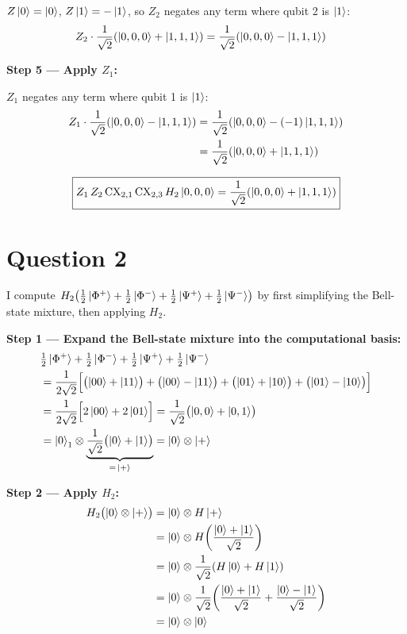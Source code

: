 \documentclass[12pt,a4paper]{article}
\begin{document}
$Z\ket{0}=\ket{0}$, $Z\ket{1}=-\ket{1}$, so $Z_2$ negates any term where qubit 2 is $\ket{1}$:
\begin{align*}
Z_2\cdot\frac{1}{\sqrt{2}}\!\left(\ket{0,0,0}+\ket{1,1,1}\right)
  &= \frac{1}{\sqrt{2}}\!\left(\ket{0,0,0}-\ket{1,1,1}\right)
\end{align*}

\textbf{Step 5 --- Apply $Z_1$:}

$Z_1$ negates any term where qubit 1 is $\ket{1}$:
\begin{align*}
Z_1\cdot\frac{1}{\sqrt{2}}\!\left(\ket{0,0,0}-\ket{1,1,1}\right)
  &= \frac{1}{\sqrt{2}}\!\left(\ket{0,0,0}-(-1)\ket{1,1,1}\right) \\
  &= \frac{1}{\sqrt{2}}\!\left(\ket{0,0,0}+\ket{1,1,1}\right)
\end{align*}

\[
  \boxed{Z_1\,Z_2\,\mathrm{CX}_{2,1}\,\mathrm{CX}_{2,3}\,H_2\ket{0,0,0}
         = \frac{1}{\sqrt{2}}\!\left(\ket{0,0,0}+\ket{1,1,1}\right)}
\]

\section*{Question 2}

I compute $H_2\!\left(\tfrac{1}{2}\ket{\Phi^+}+\tfrac{1}{2}\ket{\Phi^-}
+\tfrac{1}{2}\ket{\Psi^+}+\tfrac{1}{2}\ket{\Psi^-}\right)$
by first simplifying the Bell-state mixture, then applying $H_2$.

\medskip
\textbf{Step 1 --- Expand the Bell-state mixture into the computational basis:}
\begin{align*}
&\tfrac{1}{2}\ket{\Phi^+}+\tfrac{1}{2}\ket{\Phi^-}+\tfrac{1}{2}\ket{\Psi^+}+\tfrac{1}{2}\ket{\Psi^-} \\
&= \frac{1}{2\sqrt{2}}\Bigl[
   \bigl(\ket{00}+\ket{11}\bigr)
  +\bigl(\ket{00}-\ket{11}\bigr)
  +\bigl(\ket{01}+\ket{10}\bigr)
  +\bigl(\ket{01}-\ket{10}\bigr)\Bigr] \\
&= \frac{1}{2\sqrt{2}}\Bigl[2\ket{00}+2\ket{01}\Bigr]
 = \frac{1}{\sqrt{2}}\bigl(\ket{0,0}+\ket{0,1}\bigr) \\
&= \ket{0}_1 \otimes \underbrace{\frac{1}{\sqrt{2}}\bigl(\ket{0}+\ket{1}\bigr)}_{=\,\ket{+}}
 = \ket{0}\otimes\ket{+}
\end{align*}

\textbf{Step 2 --- Apply $H_2$:}
\begin{align*}
H_2\bigl(\ket{0}\otimes\ket{+}\bigr)
  &= \ket{0}\otimes H\ket{+} \\
  &= \ket{0}\otimes H\!\left(\frac{\ket{0}+\ket{1}}{\sqrt{2}}\right) \\
  &= \ket{0}\otimes\frac{1}{\sqrt{2}}\!\left(H\ket{0}+H\ket{1}\right) \\
  &= \ket{0}\otimes\frac{1}{\sqrt{2}}\!\left(
       \frac{\ket{0}+\ket{1}}{\sqrt{2}}+\frac{\ket{0}-\ket{1}}{\sqrt{2}}\right) \\
  &= \ket{0}\otimes\ket{0}
\end{align*}
\end{document}
